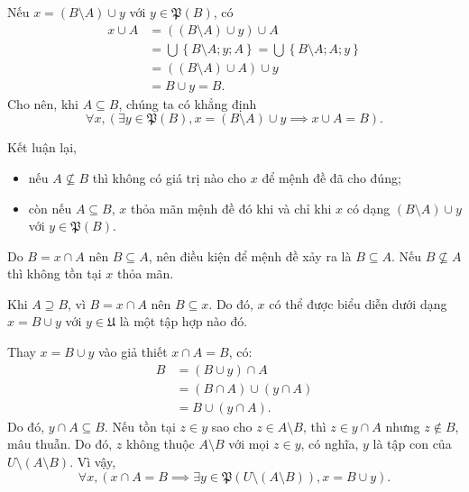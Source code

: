 Nếu $x = (B \setminus A) \cup y$ với $y \in \mathfrak{P}(B)$, có 
\begin{align*}
   x \cup A &= ((B \setminus A) \cup y) \cup A \\
         &= \bigcup \left\{B \setminus A; y; A\right\} = \bigcup \left\{B \setminus A; A; y\right\} \\ 
         &= ((B \setminus A) \cup A) \cup y \\
         &= B \cup y = B.
\end{align*}
Cho nên, khi $A \subseteq B$, chúng ta có khẳng định \begin{equation*}
   \forall x, \left(\exists y \in \mathfrak{P}(B), x = (B \setminus A) \cup y \implies x \cup A = B\right).
\end{equation*}

Kết luận lại, 
\begin{itemize}
   \item nếu $A \nsubseteq B$ thì không có giá trị nào cho $x$ để mệnh đề đã cho đúng;
   \item còn nếu $A \subseteq B$, $x$ thỏa mãn mệnh đề đó khi và chỉ khi $x$ có dạng $(B \setminus A) \cup y$ với $y \in \mathfrak{P}(B)$.
\end{itemize}

\stepSubexercise Do $B = x \cap A$ nên $B \subseteq A$, nên điều kiện để mệnh đề xảy ra là $B \subseteq A$. Nếu $B \nsubseteq A$ thì không tồn tại $x$ thỏa mãn.

Khi $A \supseteq B$, vì $B = x \cap A$ nên $B \subseteq x$. Do đó, $x$ có thể được biểu diễn dưới dạng $x = B \cup y$ với $y \in \mathfrak{U}$ là một tập hợp nào đó.

Thay $x = B \cup y$ vào giả thiết $x \cap A = B$, có:
\begin{align*}
   B &= (B \cup y) \cap A \\
      &= (B \cap A) \cup (y \cap A)\\
      &= B \cup (y \cap A).
\end{align*}
Do đó, $y \cap A \subseteq B$. Nếu tồn tại $z \in y$ sao cho $z \in A \setminus B$, thì $z \in y \cap A$ nhưng $z \notin B$, mâu thuẫn. Do đó, $z$ không thuộc $A \setminus B$ với mọi $z \in y$, có nghĩa, $y$ là tập con của $U \setminus (A \setminus B)$. Vì vậy,
\begin{equation*}
   \forall x, \left(x \cap A = B \implies \exists y \in \mathfrak{P}(U \setminus (A \setminus B)), x = B \cup y\right).
\end{equation*}

